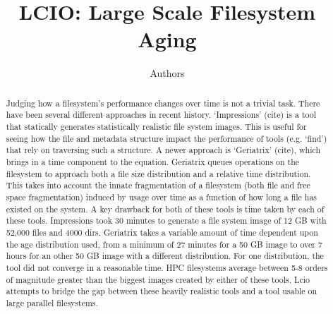 \documentclass[11pt]{amsart}
\title{LCIO: Large Scale Filesystem Aging}
\author{Authors}
\begin{document}
\maketitle

\begin{abstract}
Judging how a filesystem's performance changes over time is not a trivial task. There have been
several different approaches in recent history. `Impressions' (cite) is a tool that statically
generates statistically realistic file system images. This is useful for seeing how the 
file and metadata structure impact the performance of tools (e.g. `find') that rely on
traversing such a structure. 
A newer approach is `Geriatrix' (cite), which brings in a time component to the 
equation. Geriatrix queues operations on the filesystem to approach both a file size 
distribution and a relative 
time distribution. This takes into account the innate fragmentation of a filesystem 
(both file and free space fragmentation) induced by usage over time as a function of how long 
a file has existed on the system.
A key drawback for both of these tools is time taken by each of these tools. Impressions took
30 minutes to generate a file system image of 12 GB with 52,000 files and 4000 dirs. Geriatrix
takes a variable amount of time dependent upon the age distribution used, from a minimum of 27 minutes
for a 50 GB image to over 7 hours for an other 50 GB image with a different distribution. For one 
distribution, the tool did not converge in a reasonable time. 
HPC filesystems average between 5-8 orders of magnitude greater than the biggest images created by 
either of these tools. Lcio attempts to bridge the gap between these heavily realistic tools and a 
tool usable on large parallel filesystems. 
\end{abstract}
\end{document}
